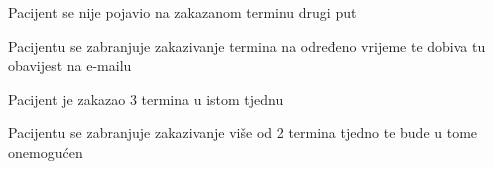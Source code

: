 \begin{packed_item}
\begin{packed_item}
							\item[2.b] Pacijent se nije pojavio na zakazanom terminu drugi put
							\item[] \begin{packed_enum}
								
								\item Pacijentu se zabranjuje zakazivanje termina na određeno vrijeme te dobiva tu obavijest na e-mailu
								
							\end{packed_enum}
							
							\item[2.c] Pacijent je zakazao 3 termina u istom tjednu
							\item[] \begin{packed_enum}
								
								\item Pacijentu se zabranjuje zakazivanje više od 2 termina tjedno te bude u tome onemogućen
								
							\end{packed_enum}
							
						\end{packed_item}
					\end{packed_item}
					
